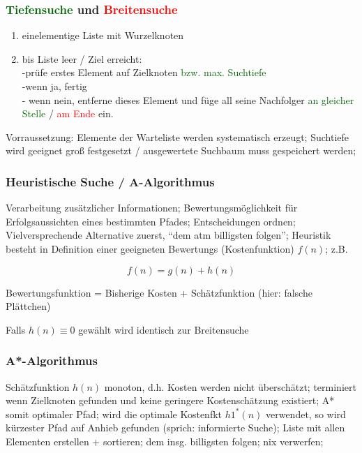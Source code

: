 \documentclass[german,color,6pt]{latex4ei/latex4ei_sheet}
\begin{document}
\begin{sectionbox}
\subsubsection{\textcolor{darkgreen}{Tiefensuche} und \textcolor{red}{Breitensuche}}
\begin{enumerate}
	\item einelementige Liste mit Wurzelknoten
	\item bis Liste leer / Ziel erreicht: \\ -prüfe erstes Element auf Zielknoten \textcolor{darkgreen}{bzw. max. Suchtiefe} \\-wenn ja, fertig \\ - wenn nein, entferne dieses Element und füge all seine Nachfolger \textcolor{darkgreen}{ an gleicher Stelle} / \textcolor{red}{am Ende} ein.
\end{enumerate}

Vorraussetzung: Elemente der Warteliste werden systematisch erzeugt; Suchtiefe wird geeignet groß festgesetzt / ausgewertete Suchbaum muss gespeichert werden;
\end{sectionbox}

\begin{sectionbox}
\subsubsection{Heuristische Suche / A-Algorithmus}
Verarbeitung zusätzlicher Informationen; Bewertungsmöglichkeit für Erfolgsaussichten eines bestimmten Pfades; Entscheidungen ordnen; Vielversprechende Alternative zuerst, "`dem atm billigsten folgen"'; Heuristik besteht in Definition einer geeigneten Bewertungs (Kostenfunktion) $f(n)$; z.B.

\begin{equation*}
f(n) = g(n) + h(n)
\end{equation*}

Bewertungsfunktion = Bisherige Kosten + Schätzfunktion (hier: falsche Plättchen)

Falls $h(n) \equiv 0$ gewählt wird identisch zur Breitensuche
\end{sectionbox}

\begin{sectionbox}
\subsubsection{A*-Algorithmus}
Schätzfunktion $h(n)$ monoton, d.h. Kosten werden nicht überschätzt; terminiert wenn Zielknoten gefunden und keine geringere Kostenschätzung existiert; A* somit optimaler Pfad; wird die optimale Kostenfkt $h1^*(n)$ verwendet, so wird kürzester Pfad auf Anhieb gefunden (sprich: informierte Suche); Liste mit allen Elementen erstellen + sortieren; dem insg. billigsten folgen; nix verwerfen;
\end{sectionbox}
\end{document}
